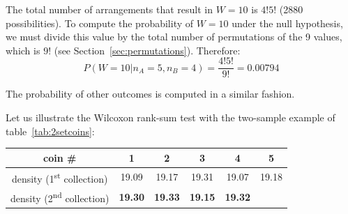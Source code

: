 The total number of arrangements that result in $W=10$ is $4!5!$ (2880
possibilities). To compute the probability of $W=10$ under the null
hypothesis, we must divide this value by the total number of
permutations of the 9 values, which is $9!$ (see
Section~\ref{sec:permutations}). Therefore:
\[
P(W=10|n_A=5,n_B=4) = \frac{4!5!}{9!} = 0.00794
\]

The probability of other outcomes is computed in a similar fashion.\medskip

Let us illustrate the Wilcoxon rank-sum test with the two-sample
example of table~\ref{tab:2setcoins}:

\begin{center}
\begin{tabular}{c|ccccc}
  coin \# & 1 & 2 & 3 & 4 & 5 \\ \hline
  density (1\textsuperscript{st} collection) &
  19.09 & 19.17 & 19.31 & 19.07 & 19.18 \\
  density (2\textsuperscript{nd} collection) &
  \textbf{19.30} & \textbf{19.33} & \textbf{19.15} & \textbf{19.32}
\end{tabular}
\label{tab:mannwhitneycoins}
\end{center}

